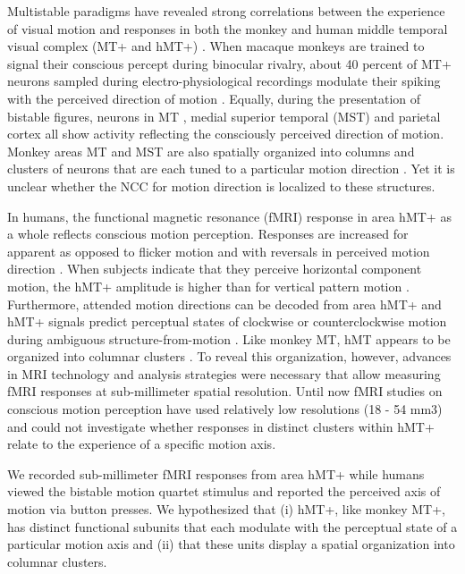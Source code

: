 Multistable paradigms have revealed strong correlations between the experience of visual motion and responses in both the monkey and human middle temporal visual complex (MT+ and hMT+) \parencite{Leopold1999, Rees2007, Sterzer2009}. When macaque monkeys are trained to signal their conscious percept during binocular rivalry, about 40 percent of MT+ neurons sampled during electro-physiological recordings modulate their spiking with the perceived direction of motion \parencite{Logothetis1989, Leopold1999}. Equally, during the presentation of bistable figures, neurons in MT \parencite{Dodd2001}, medial superior temporal (MST) and parietal cortex \parencite{Williams2003} all show activity reflecting the consciously perceived direction of motion. Monkey areas MT and MST are also spatially organized into columns and clusters of neurons that are each tuned to a particular motion direction \parencite{Albright1984, Salzman1990, Britten1998}. Yet it is unclear whether the NCC for motion direction is localized to these structures.

In humans, the functional magnetic resonance (fMRI) response in area hMT+ as a whole reflects conscious motion perception. Responses are increased for apparent as opposed to flicker motion \parencite{Muckli2002} and with reversals in perceived motion direction \parencite{Sterzer2002}. When subjects indicate that they perceive horizontal component motion, the hMT+ amplitude is higher than for vertical pattern motion \parencite{Castelo-Branco2002}. Furthermore, attended motion directions can be decoded from area hMT+ \parencite{Kamitani2006} and hMT+ signals predict perceptual states of clockwise or counterclockwise motion during ambiguous structure-from-motion \parencite{Brouwer2007}. Like monkey MT, hMT appears to be organized into columnar clusters \parencite{Zimmermann2011}. To reveal this organization, however, advances in MRI technology \parencite{Ugurbil2003} and analysis strategies \parencite{Kemper2017,Polimeni2017} were necessary that allow measuring fMRI responses at sub-millimeter spatial resolution. Until now fMRI studies on conscious motion perception have used relatively low resolutions (18 - 54 mm3) and could not investigate whether responses in distinct clusters within hMT+ relate to the experience of a specific motion axis.

We recorded sub-millimeter fMRI responses from area hMT+ while humans viewed the bistable motion quartet stimulus and reported the perceived axis of motion via button presses. We hypothesized that (i) hMT+, like monkey MT+, has distinct functional subunits that each modulate with the perceptual state of a particular motion axis and (ii) that these units display a spatial organization into columnar clusters.

